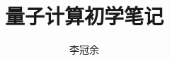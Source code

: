 \documentclass[12pt,reqno]{report}
\theoremstyle{boldtheorem}
\begin{document}
	\title{\textsf{\huge 量子计算初学笔记}}
	\author{李冠余}
	\date{}
	\maketitle
   
   \begin{spacing}{1.5}
   
   
   
   \end{spacing}
\end{document}
